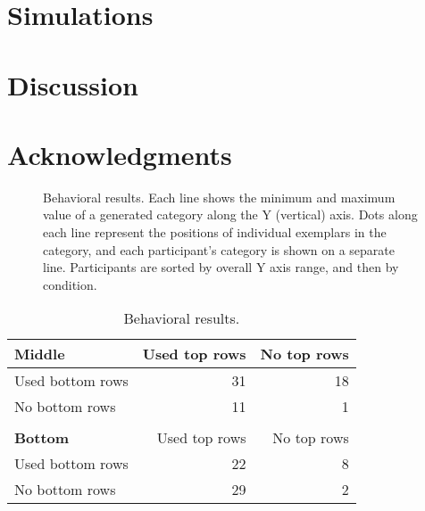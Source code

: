 \documentclass[10pt,letterpaper]{article}
\begin{document}
\section{Simulations}
\section{Discussion}
\section{Acknowledgments}






\begin{figure*}
    \begin{center}
    
    \caption{Behavioral results. Each line shows the minimum and maximum value of a generated category along the Y (vertical) axis. Dots along each line represent the positions of individual exemplars in the category, and each participant's category is shown on a separate line. Participants are sorted by overall Y axis range, and then by condition.}
    \label{fig:middle-bottom-yranges}
    \end{center}
\end{figure*}

\begin{table}[!ht]
\begin{center} 
\caption{Behavioral results.} 
\label{table:subset-table} 
\vskip 0.12in
\begin{tabular}{ l r r}
    \textbf{Middle}         & Used top rows & No top rows \\
    \hline
    Used bottom rows        &  31 & 18  \\
    No bottom rows          &  11 &  1  \\
    \\
    \textbf{Bottom}         & Used top rows & No top rows \\
    \hline
    Used bottom rows        & 22 & 8 \\
    No bottom rows          & 29 & 2 \\
\end{tabular}
\end{center} 
\end{table}





\setlength{\bibleftmargin}{.025in}
\setlength{\bibindent}{-\bibleftmargin}

\end{document}
